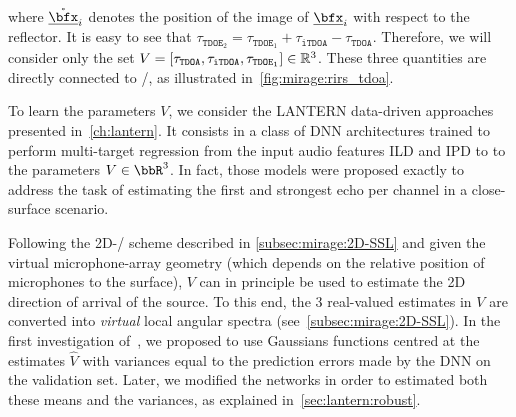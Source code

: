where $\mathring{\positionMicrophone}_i$ denotes the position of the image of $\positionMicrophone_i$ with respect to the reflector.
It is easy to see that $\tau_{\mathtt{TDOE}_2} =  \tau_{\mathtt{TDOE}_1} + \tau_\mathtt{iTDOA} - \tau_\mathtt{TDOA}$.
Therefore, we will consider only the set $V = \klist{\tau_{\mathtt{TDOA}}, \tau_{\mathtt{iTDOA}}, \tau_{\mathtt{TDOE}_1}}\in\mathbb{R}^3$.
These three quantities are directly connected to \RIRs/, as illustrated in~\cref{fig:mirage:rirs_tdoa}.%

\mynewline
To learn the parameters $V$, we consider the \acs{LANTERN} data-driven approaches presented in~\cref{ch:lantern}.
It consists in a class of \ac{DNN} architectures trained to perform multi-target regression from the input audio features \acf{ILD} and \acf{IPD} to to the parameters $V\in\bbR^3$.
In fact, those models were proposed exactly to address the task of estimating the first and strongest echo per channel in a close-surface scenario.

\mynewline
Following the 2D-\SSL/ scheme described in \cref{subsec:mirage:2D-SSL} and given the virtual microphone-array geometry (which depends on the relative position of microphones to the surface), $V$ can in principle be used to estimate the 2D direction of arrival of the source.
To this end, the 3 real-valued estimates in $V$ are converted into \textit{virtual} local angular spectra (see~\cref{subsec:mirage:2D-SSL}).
In the first investigation of~, we proposed to use Gaussians functions centred at the estimates $\hat{V}$ with variances equal to the prediction errors made by the \ac{DNN} on the validation set.
Later, we modified the networks in order to estimated both these means and the variances, as explained in~\cref{sec:lantern:robust}.

